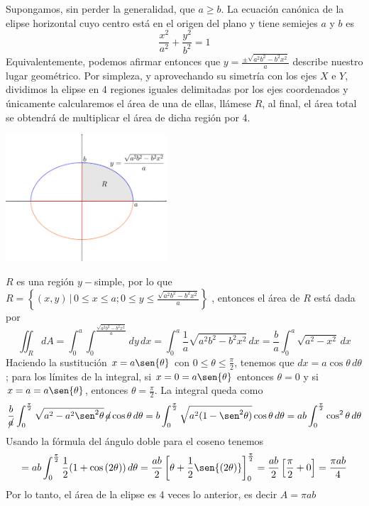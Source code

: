 \documentclass{article}
\begin{document}
\begin{enumerate}
{        \color{azul}
        Supongamos, sin perder la generalidad, que $a\geq b$. La ecuación canónica de la elipse horizontal cuyo centro está en el origen del plano y tiene semiejes $a$ y $b$ es
        \[
            \frac{x^2}{a^2}+\frac{y^2}{b^2}=1
        \]
        Equivalentemente, podemos afirmar entonces que
        \(\displaystyle
            y=\frac{\pm\sqrt{a^2 b^2 -b^2 x^2}}{a}
        \)
        describe nuestro lugar geométrico. Por simpleza, y aprovechando su simetría con los ejes $X$ e $Y$, dividimos la elipse en 4 regiones iguales delimitadas por los ejes coordenados y únicamente calcularemos el área de una de ellas, llámese $R$, al final, el área total se obtendrá de multiplicar el área de dicha región por 4.
        \begin{center}
            \includegraphics[width=6cm]{img/ej4.png}
        \end{center}
        $R$ es una región $y-$simple, por lo que
        \(\displaystyle
            R=\left\{
                (x,y)\,\bigg\vert\,
                0\leq x\leq a;
                0\leq y\leq\frac{\sqrt{a^2b^2-b^2x^2}}{a}
            \right\}
        \)
        , entonces el área de $R$ está dada por
        \[
            \iint_R{dA}
            =\int_0^a{\int_0^{ \frac{\sqrt{a^2b^2-b^2x^2}}{a} }{dy}\,dx}
            =\int_0^a{\frac{1}{a}\sqrt{a^2b^2-b^2x^2}\,dx}
            =\frac{b}{a}\int_0^a{\sqrt{a^2-x^2}\,dx}
        \]
        Haciendo la sustitución $x=a \sen{\theta}$ con $0\leq\theta\leq\frac{\pi}{2}$, tenemos que $dx=a\cos{\theta}\,d\theta$; para los límites de la integral, si $x=0=a\sen{\theta}$ entonces $\theta=0$ y si $x=a=a\sen{\theta}$, entonces $\theta=\frac{\pi}{2}$. La integral queda como
        \[
            \frac{b}{\cancel{a}}\int_0^{\frac{\pi}{2}}{
                \sqrt{a^2-a^2\sen^2{\theta}}\,\cancel{a}\cos{\theta}\,d\theta
            }
            =b\int_0^{\frac{\pi}{2}}{
                \sqrt{a^2(1-\sen^2{\theta})}\cos{\theta}\,d\theta
            }
            =ab\int_0^{\frac{\pi}{2}}{
                \cos^2{\theta}\,d\theta
            }
        \]
        Usando la fórmula del ángulo doble para el coseno tenemos
        \[
            =ab\int_0^\frac{\pi}{2}{
                \frac{1}{2}(1+\cos{(2\theta)})
            \,d\theta}
            =\frac{ab}{2}\left[
                \theta + \frac{1}{2}\sen{(2\theta)}
            \right]_0^\frac{\pi}{2}
            =\frac{ab}{2}\left[
                \frac{\pi}{2}+0
            \right]
            =\frac{\pi ab}{4}
        \]
        Por lo tanto, el área de la elipse es 4 veces lo anterior, es decir $A=\pi ab$
	}


\end{enumerate}
\end{document}
